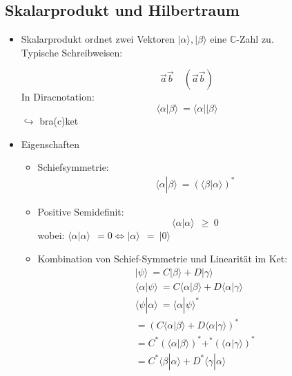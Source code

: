 \documentclass[10pt,article,colorback,accentcolor=tud9d]{scrartcl}
\begin{document}
\subsection{Skalarprodukt und Hilbertraum}
\begin{itemize}
\item Skalarprodukt ordnet zwei Vektoren $\left|\alpha\rangle \right.,\left|\beta\rangle 
\right.$ eine $\mathbb{C}$-Zahl zu.\\
Typische Schreibweisen:
 
\begin{equation}
\vec{a}\vec{b} \quad (\vec{a}\vec{b})
\end{equation}
In Diracnotation:
\begin{equation}
\langle \alpha\left|\right.\beta\rangle  \ =\langle \alpha \left|\right|\beta\rangle 
\end{equation}
$\hookrightarrow$ bra(c)ket
\item Eigenschaften
\begin{itemize}
\item Schiefsymmetrie:
\begin{equation}
\begin{aligned}
\langle \alpha\left|\right.\beta\rangle  \ =(\langle \beta\left|\right.\alpha\rangle )^*
\end{aligned}
\end{equation}
\item Positive Semidefinit: 
\begin{equation}
\langle \alpha\left|\right.\alpha\rangle  \ \ \geq \ 0
\end{equation}
wobei: $\langle \alpha\left|\right.\alpha\rangle  \ \ = 0 \Leftrightarrow \left|
\alpha\right.\rangle  \ \ = \ \left|0\right.\rangle $
\item Kombination von Schief-Symmetrie und Linearität im Ket:
\begin{equation}
\begin{aligned}
\left|\right.\psi\rangle  \ = C\left|\right.\beta\rangle +D\left|\right.\gamma\rangle \\
\langle \alpha\left|\right.\psi\rangle  \ =C\langle \alpha\left|\right.\beta\rangle  +D\langle \alpha\left|\right
.\gamma\rangle \\
\langle \psi\left|\right.\alpha\rangle  \ =\langle \alpha\left|\right.\psi\rangle ^* \\
 =(C \langle \alpha\left|\right.\beta\rangle  + D\langle \alpha\left|\right.\gamma\rangle )^*\\
=C^*(\langle \alpha\left|\right.\beta\rangle )^* + ^*(\langle \alpha\left|\right.\gamma\rangle )^*\\
=C^*\langle \beta\left|\right.\alpha\rangle  +D^*\langle \gamma\left|\right.\alpha\rangle 
\end{aligned}
\end{equation}
\end{itemize}
 

\end{itemize}
\end{document}
